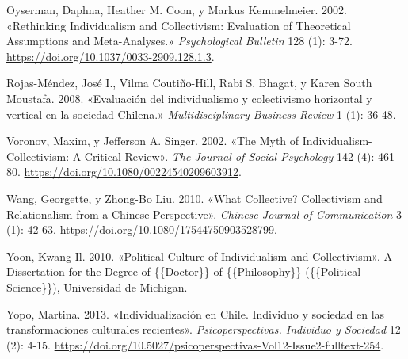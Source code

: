 \documentclass[
  letterpaper,
  DIV=11,
  numbers=noendperiod]{scrartcl}
\newlength{\cslhangindent}
\newenvironment{CSLReferences}[2] %
 {\begin{list}{}{%
  \setlength{\itemindent}{0pt}
  \setlength{\leftmargin}{0pt}
  \setlength{\parsep}{0pt}
  \ifodd #1
   \setlength{\leftmargin}{\cslhangindent}
   \setlength{\itemindent}{-1\cslhangindent}
  \fi
  \setlength{\itemsep}{#2\baselineskip}}}
 {\end{list}}
\begin{document}
\begin{CSLReferences}{1}{0}
Oyserman, Daphna, Heather M. Coon, y Markus Kemmelmeier. 2002.
{«Rethinking Individualism and Collectivism: {Evaluation} of Theoretical
Assumptions and Meta-Analyses.»} \emph{Psychological Bulletin} 128 (1):
3-72. \url{https://doi.org/10.1037/0033-2909.128.1.3}.

Rojas-Méndez, José I., Vilma Coutiño-Hill, Rabi S. Bhagat, y Karen South
Moustafa. 2008. {«{Evaluaci{ó}n del individualismo y colectivismo
horizontal y vertical en la sociedad Chilena.}»} \emph{Multidisciplinary
Business Review} 1 (1): 36-48.

Voronov, Maxim, y Jefferson A. Singer. 2002. {«The {Myth} of
{Individualism-Collectivism}: {A Critical Review}»}. \emph{The Journal
of Social Psychology} 142 (4): 461-80.
\url{https://doi.org/10.1080/00224540209603912}.

Wang, Georgette, y Zhong-Bo Liu. 2010. {«What Collective? {Collectivism}
and Relationalism from a {Chinese} Perspective»}. \emph{Chinese Journal
of Communication} 3 (1): 42-63.
\url{https://doi.org/10.1080/17544750903528799}.

Yoon, Kwang-Il. 2010. {«Political {Culture} of {Individualism} and
{Collectivism}»}. A Dissertation for the Degree of \{\{Doctor\}\} of
\{\{Philosophy\}\} (\{\{Political Science\}\}), Universidad de Michigan.

Yopo, Martina. 2013. {«{Individualizaci{ó}n en Chile. Individuo y
sociedad en las transformaciones culturales recientes}»}.
\emph{Psicoperspectivas. Individuo y Sociedad} 12 (2): 4-15.
\url{https://doi.org/10.5027/psicoperspectivas-Vol12-Issue2-fulltext-254}.

\end{CSLReferences}
\end{document}

